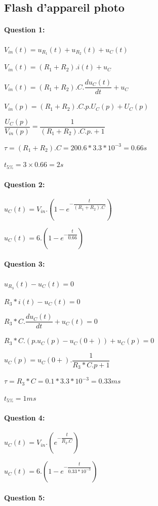 \subsection{Flash d'appareil photo}

\paragraph{Question 1:}

$V_{in}(t)=u_{R_1}(t)+u_{R_2}(t)+u_C(t)$

$V_{in}(t)=(R_1+R_2).i(t)+u_C$

$V_{in}(t)=(R_1+R_2).C.\dfrac{du_C(t)}{dt}+u_C$

$V_{in}(p)=(R_1+R_2).C.p.U_C(p)+U_C(p)$

$\dfrac{U_C(p)}{V_{in}(p)}=\dfrac{1}{(R_1+R_2).C.p.+1}$

$\tau=(R_1+R_2).C=200.6*3.3*10^{-3}=0.66s$

$t_{5\%}=3\times 0.66=2s$

\paragraph{Question 2:}

$u_C(t)=V_{in}.\left(1-e^{-\dfrac{t}{(R_1+R_2).C}}\right)$

$u_C(t)=6.\left(1-e^{-\dfrac{t}{0.66}}\right)$

\paragraph{Question 3:}

$u_{R_3}(t)-u_C(t)=0$

$R_3*i(t)-u_C(t)=0$

$R_3*C.\dfrac{du_C(t)}{dt}+u_C(t)=0$

$R_3*C.(p.u_C(p)-u_C(0+))+u_C(p)=0$

$u_C(p)=u_C(0+).\dfrac{1}{R_3*C.p+1}$

$\tau=R_3*C=0.1*3.3*10^{-3}=0.33ms$

$t_{5\%}=1ms$

\paragraph{Question 4:}

$u_C(t)=V_{in}.\left(e^{-\dfrac{t}{R_3.C}}\right)$

$u_C(t)=6.\left(1-e^{-\dfrac{t}{0.33*10^{-3}}}\right)$

\paragraph{Question 5:}

